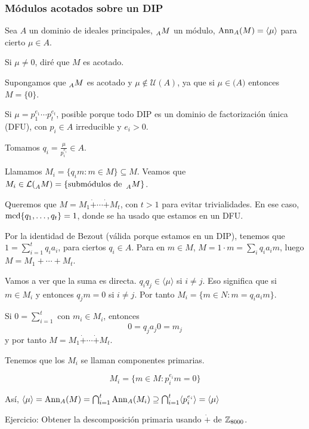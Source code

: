 \subsubsection{Módulos acotados sobre un DIP}

\begin{df}
  Sea \(A\) un dominio de ideales principales, \(\prescript{}{A}{M}\)
  un módulo, \(\operatorname{Ann}_A(M)=\langle\mu\rangle\) para cierto \(\mu\in A\).

  Si \(\mu\neq 0\), diré que \(M\) es acotado.
\end{df}

Supongamos que \(\prescript{}{A}{M}\) es acotado y \(\mu\not\in
\mathcal{U}(A)\), ya que si \(\mu\in\mathcal(A)\) entonces \(M=\{0\}\).

Si \(\mu=p_1^{e_1}\cdots p_t^{e_t}\), posible porque todo DIP es un
dominio de factorización única (DFU), con \(p_i\in A\) irreducible
y \(e_i>0\).

\begin{prop}
  Tomamos \(q_i=\frac{\mu}{p_i^{e_i}}\in A\).

  Llamamos \(M_i=\{q_i m:m \in M\}\subseteq M\). Veamos
  que \(M_i\in\mathcal{L}(\prescript{}{A}{M})=\{\textrm{submódulos
  de } \prescript{}{A}{M}\}\).

  Queremos que \(M=M_1\dot{+}\cdots \dot{+}M_t\), con \(t>1\) para
  evitar trivialidades. En ese caso, \(\operatorname{mcd}\{q_1,\ldots,q_t\}=1\),
  donde se ha usado que estamos en un DFU.\@

  Por la identidad de Bezout (válida porque estamos en un DIP),
  tenemos que \(1=\sum_{i=1}^t q_i a_i\), para ciertos \(q_i\in A\).
  Para en \(m\in M\), \(M=1\cdot m=\sum_i q_i a_i m\), luego
  \(M=M_1+\cdots+ M_t\).

  Vamos a ver que la suma es directa.
  \(q_i q_j\in\langle\mu\rangle\) si \(i\neq j\). Eso significa que si
  \(m\in M_i\) y entonces \(q_j m= 0\) si \(i\neq j\).
  Por tanto \(M_i=\{m\in N: m=q_i a_i m\}\).

  Si \(0=\sum_{i=1}^t\) con \(m_i\in M_i\), entonces
  \[
    0=q_j a_j 0=m_j
  \]
  y por tanto \(M=M_1\dot{+}\cdots\dot{+} M_t\).
\end{prop}

\begin{df}
  Tenemos que los \(M_i\) se llaman componentes primarias.
\end{df}
\begin{prop}
  \[
    M_i=\{m\in M: p_i^{e_i} m=0\}
  \]

  Así, \(\langle\mu\rangle=\operatorname{Ann}_A(M)=\bigcap_{i=1}^t\operatorname{Ann}_A(M_i)
  \supseteq\bigcap_{i=1}^t\langle p_i^{e_i}\rangle=\langle\mu\rangle\)
\end{prop}

Ejercicio: Obtener la descomposición primaria usando \(\dot{+}\) de
\(\mathbb{Z}_{8000}\).
